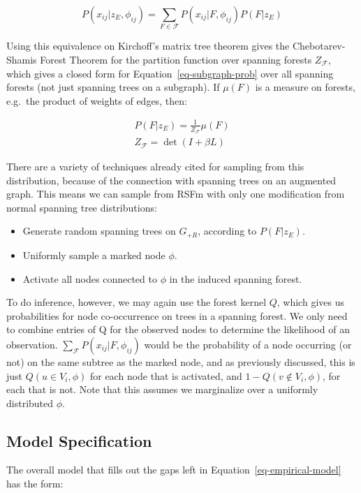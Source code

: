 \documentclass[%
	12pt,
		oneside,
		letterpaper
]{book}
\providecommand{\tightlist}{%
  \setlength{\itemsep}{0pt}\setlength{\parskip}{0pt}}\usepackage{longtable,booktabs,array}
\begin{document}
\[
P(x_{ij}|z_E, \phi_{ij}) = \sum_{F\in\mathcal{F}}P(x_{ij}| F,\phi_{ij}) P(F|z_E)
\]

Using this equivalence on Kirchoff's matrix tree theorem gives the
Chebotarev-Shamis Forest
Theorem\autocite{MatrixForestTheorem_Chebotarev2006} for the partition
function over spanning forests \(Z_\mathcal{F}\), which gives a closed
form for Equation~\ref{eq-subgraph-prob} over all spanning forests (not
just spanning trees on a subgraph). If \(\mu(F)\) is a measure on
forests, e.g.~the product of weights of edges, then:

\[
\begin{gathered}
P(F|z_E) = \frac{1}{Z_\mathcal{F}} \mu(F)\\
Z_\mathcal{F} = \det{(I+\beta L)}
\end{gathered}
\]

There are a variety of techniques already cited for sampling from this
distribution, because of the connection with spanning trees on an
augmented graph. This means we can sample from RSFm with only one
modification from normal spanning tree distributions:

\begin{itemize}
\tightlist
\item
  Generate random spanning trees on \(G_{+R}\), according to
  \(P(F|z_E)\).
\item
  Uniformly sample a marked node \(\phi\).
\item
  Activate all nodes connected to \(\phi\) in the induced spanning
  forest.
\end{itemize}

To do inference, however, we may again use the forest kernel \(Q\),
which gives us probabilities for node co-occurrence on trees in a
spanning forest. We only need to combine entries of Q for the observed
nodes to determine the likelihood of an observation.
\(\sum_\mathcal{F} P(x_{ij}|F,\phi_{ij})\) would be the probability of a
node occurring (or not) on the same subtree as the marked node, and as
previously discussed, this is just \(Q(u\in V_i,\phi)\) for each node
that is activated, and \(1-Q(v\notin V_i,\phi)\), for each that is not.
Note that this assumes we marginalize over a uniformly distributed
\(\phi\).

\subsection{Model Specification}\label{sec-lfa-gibbs}

The overall model that fills out the gaps left in
Equation~\ref{eq-empirical-model} has the form:
\end{document}

